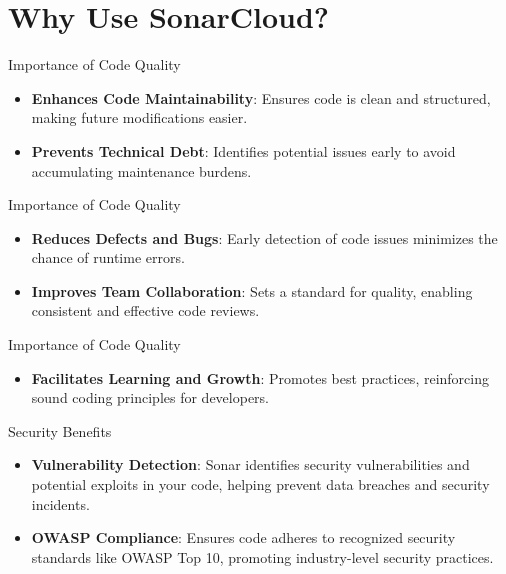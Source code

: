 \documentclass{beamer}
\begin{document}
\section[Why Use SonarCloud?]{Why Use SonarCloud?}

\begin{frame}{Importance of Code Quality}
  \begin{itemize}
    \item \textbf{Enhances Code Maintainability}: Ensures code is clean and structured, making future modifications easier.
    \vspace*{1em}
    \item \textbf{Prevents Technical Debt}: Identifies potential issues early to avoid accumulating maintenance burdens.
  \end{itemize}
\end{frame}

\begin{frame}{Importance of Code Quality}
  \begin{itemize}
    \item \textbf{Reduces Defects and Bugs}: Early detection of code issues minimizes the chance of runtime errors.
    \vspace*{1em}
    \item \textbf{Improves Team Collaboration}: Sets a standard for quality, enabling consistent and effective code reviews.
  \end{itemize}
\end{frame}

\begin{frame}{Importance of Code Quality}
  \begin{itemize}
    \item \textbf{Facilitates Learning and Growth}: Promotes best practices, reinforcing sound coding principles for developers.
  \end{itemize}
\end{frame}


\begin{frame}{Security Benefits}
  \begin{itemize}
    \item \textbf{Vulnerability Detection}: Sonar identifies security vulnerabilities and potential exploits in your code, helping prevent data breaches and security incidents.
    \vspace*{1em}
    \item \textbf{OWASP Compliance}: Ensures code adheres to recognized security standards like OWASP Top 10, promoting industry-level security practices.
  \end{itemize}
\end{frame}
\end{document}
